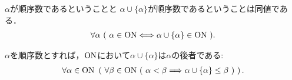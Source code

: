 	\begin{screen}
		\begin{thm}[順序数は自分自身との合併が後者となる]\label{thm:latter_element_is_ordinal}
			$\alpha$が順序数であるということと $\alpha \cup \{\alpha\}$が順序数であるということは同値である．
			\begin{align}
				\forall \alpha\ (\ \alpha \in \mathrm{ON} \Longleftrightarrow \alpha \cup \{\alpha\} \in \mathrm{ON}\ ).
			\end{align}
		\end{thm}
	\end{screen}
	
	\begin{screen}
		\begin{thm}[順序数は自分自身との合併が後者となる]
			$\alpha$を順序数とすれば，$\mathrm{ON}$において$\alpha \cup \{\alpha\}$は$\alpha$の後者である:
			\begin{align}
				\forall \alpha \in \ON\ 
				\left(\ \forall \beta \in \ON\ (\ \alpha < \beta 
				\Longrightarrow \alpha \cup \{\alpha\} \leq \beta\ )
				\ \right).
			\end{align}
		\end{thm}
	\end{screen}